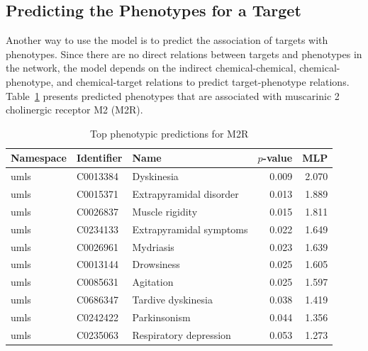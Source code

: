 \subsection{Predicting the Phenotypes for a Target}

Another way to use the model is to predict the association of targets with phenotypes.
Since there are no direct relations between targets and phenotypes in the network, the model depends on the indirect chemical-chemical, chemical-phenotype, and chemical-target relations to predict target-phenotype relations.
Table~\ref{tab:target_phenotype} presents predicted phenotypes that are associated with muscarinic 2 cholinergic receptor M2 (M2R).

\begin{table}[h]
    \centering
    \begin{tabular}{ |l|l|l|r|r| }
        \hline
        \textbf{Namespace} & \textbf{Identifier} & \textbf{Name} & \textbf{$p$-value} & \textbf{MLP} \\
        \hline
        umls & C0013384 & Dyskinesia & 0.009 & 2.070 \\
        \hline
        umls & C0015371 & Extrapyramidal disorder & 0.013 & 1.889 \\
        \hline
        umls & C0026837 & Muscle rigidity & 0.015 & 1.811 \\
        \hline
        umls & C0234133 & Extrapyramidal symptoms & 0.022 & 1.649 \\
        \hline
        umls & C0026961 & Mydriasis & 0.023 & 1.639 \\
        \hline
        umls & C0013144 & Drowsiness & 0.025 & 1.605 \\
        \hline
        umls & C0085631 & Agitation & 0.025 & 1.597 \\
        \hline
        umls & C0686347 & Tardive dyskinesia & 0.038 & 1.419 \\
        \hline
        umls & C0242422 & Parkinsonism & 0.044 & 1.356 \\
        \hline
        umls & C0235063 & Respiratory depression & 0.053 & 1.273 \\
        \hline
    \end{tabular}
    \caption{Top phenotypic predictions for M2R}
    \label{tab:target_phenotype}
\end{table}

